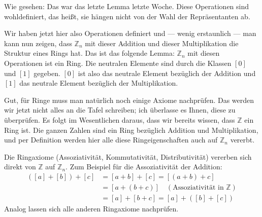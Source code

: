 \begin{spoken-clean}[00:13:04 - 00:14:17]
Wie gesehen: Das war das letzte Lemma letzte Woche. Diese Operationen sind wohldefiniert, das heißt, sie hängen nicht von der Wahl der Repräsentanten ab.

Wir haben jetzt hier also Operationen definiert und --- wenig erstaunlich --- man kann nun zeigen, dass $\mathbb{Z}_n$ mit dieser Addition und dieser Multiplikation die Struktur eines Rings hat. Das ist das folgende Lemma: $\mathbb{Z}_n$ mit diesen Operationen ist ein Ring. Die neutralen Elemente sind durch die Klassen $[0]$ und $[1]$ gegeben. $[0]$ ist also das neutrale Element bezüglich der Addition und $[1]$ das neutrale Element bezüglich der Multiplikation.

Gut, für Ringe muss man natürlich noch einige Axiome nachprüfen. Das werden wir jetzt nicht alles an die Tafel schreiben; ich überlasse es Ihnen, diese zu überprüfen. Es folgt im Wesentlichen daraus, dass wir bereits wissen, dass $\mathbb{Z}$ ein Ring ist. Die ganzen Zahlen sind ein Ring bezüglich Addition und Multiplikation, und per Definition werden hier alle diese Ringeigenschaften auch auf $\mathbb{Z}_n$ vererbt.
\end{spoken-clean}

\begin{math-stroke}

\begin{short-proof}
Die Ringaxiome (Assoziativität, Kommutativität, Distributivität) vererben sich direkt von $\mathbb{Z}$ auf $\mathbb{Z}_n$. Zum Beispiel für die Assoziativität der Addition:
\begin{align*}
([a] + [b]) + [c] &= [a + b] + [c] = [(a + b) + c] \\
&= [a + (b + c)] \quad (\text{Assoziativität in } \mathbb{Z}) \\
&= [a] + [b + c] = [a] + ([b] + [c])
\end{align*}
Analog lassen sich alle anderen Ringaxiome nachprüfen.
\end{short-proof}
\end{math-stroke}

